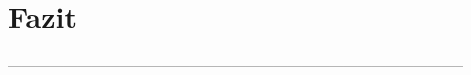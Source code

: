 \documentclass{article}
\begin{document}
\section{Fazit}
--------------------------------------------------------------------------------------------------






\end{document}
